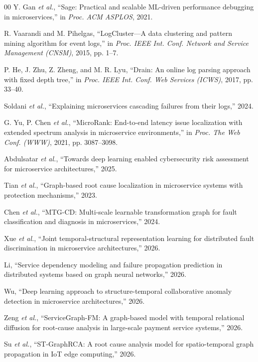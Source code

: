 \documentclass[conference]{IEEEtran}
\begin{document}
\begin{thebibliography}{00}
Y. Gan \textit{et al.}, ``Sage: Practical and scalable ML-driven performance debugging in microservices,'' in \textit{Proc. ACM ASPLOS}, 2021.

R. Vaarandi and M. Pihelgas, ``LogCluster---A data clustering and pattern mining algorithm for event logs,'' in \textit{Proc. IEEE Int. Conf. Network and Service Management (CNSM)}, 2015, pp. 1--7.

P. He, J. Zhu, Z. Zheng, and M. R. Lyu, ``Drain: An online log parsing approach with fixed depth tree,'' in \textit{Proc. IEEE Int. Conf. Web Services (ICWS)}, 2017, pp. 33--40.

Soldani \textit{et al.}, ``Explaining microservices cascading failures from their logs,'' 2024.

G. Yu, P. Chen \textit{et al.}, ``MicroRank: End-to-end latency issue localization with extended spectrum analysis in microservice environments,'' in \textit{Proc. The Web Conf. (WWW)}, 2021, pp. 3087--3098.

Abdulsatar \textit{et al.}, ``Towards deep learning enabled cybersecurity risk assessment for microservice architectures,'' 2025.

Tian \textit{et al.}, ``Graph-based root cause localization in microservice systems with protection mechanisms,'' 2023.

Chen \textit{et al.}, ``MTG-CD: Multi-scale learnable transformation graph for fault classification and diagnosis in microservices,'' 2024.

Xue \textit{et al.}, ``Joint temporal-structural representation learning for distributed fault discrimination in microservice architectures,'' 2026.

Li, ``Service dependency modeling and failure propagation prediction in distributed systems based on graph neural networks,'' 2026.

Wu, ``Deep learning approach to structure-temporal collaborative anomaly detection in microservice architectures,'' 2026.

Zeng \textit{et al.}, ``ServiceGraph-FM: A graph-based model with temporal relational diffusion for root-cause analysis in large-scale payment service systems,'' 2026.

Su \textit{et al.}, ``ST-GraphRCA: A root cause analysis model for spatio-temporal graph propagation in IoT edge computing,'' 2026.


\end{thebibliography}
\end{document}

